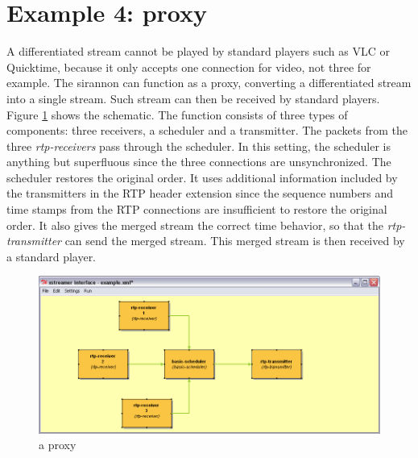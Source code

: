 \documentclass[12pt]{report}
\begin{document}
\section{Example 4: proxy}
A differentiated stream cannot be played by standard players such as VLC or Quicktime, because it only accepts one connection for video, not three for example. The sirannon can function as a proxy, converting a differentiated stream into a single stream. Such stream can then be received by standard players. Figure \ref{fig:ex:4} shows the schematic. The function consists of three types of components: three receivers, a scheduler and a transmitter. The packets from the three \textit{rtp-receivers} pass through the scheduler. In this setting, the scheduler is anything but superfluous since the three connections are unsynchronized. The scheduler restores the original order. It uses additional information included by the transmitters in the RTP header extension since the sequence numbers and time stamps from the RTP connections are insufficient to restore the original order. It also gives the merged stream the correct time behavior, so that the \textit{rtp-transmitter} can send the merged stream. This merged stream is then received by a standard player.
\begin{center}
\begin{figure}[!ht]
	\includegraphics[width=1.0\textwidth]{./images/ex04.png}
	\caption{a proxy}
	\label{fig:ex:4}
\end{figure}
\end{center}
\newpage
\end{document}
